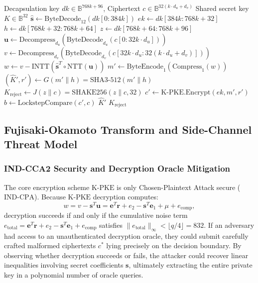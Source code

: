 \begin{algorithm}[t]
\caption{\mbox{ML-KEM.Decaps}$(dk, c)$ \cite{fips203}}
\label{alg:decaps}
\begin{algorithmic}[1]
\Require Decapsulation key $dk \in \mathbb{B}^{768k + 96}$, Ciphertext $c \in \mathbb{B}^{32(k\cdot d_u + d_v)}$
\Ensure Shared secret key $K \in \mathbb{B}^{32}$
\State $\hat{\mathbf{s}} \leftarrow \text{ByteDecode}_{12}(dk[0 : 384k])$ 
\State $ek \leftarrow dk[384k : 768k + 32]$
\State $h \leftarrow dk[768k + 32 : 768k + 64]$
\State $z \leftarrow dk[768k + 64 : 768k + 96]$
\State $\mathbf{u} \leftarrow \text{Decompress}_{d_u}(\text{ByteDecode}_{d_u}(c[0 : 32k\cdot d_u]))$
\State $v \leftarrow \text{Decompress}_{d_v}(\text{ByteDecode}_{d_v}(c[32k\cdot d_u : 32(k\cdot d_u + d_v)]))$
\State $w \leftarrow v - \text{INTT}(\hat{\mathbf{s}}^T \circ \text{NTT}(\mathbf{u}))$ 
\State $m' \leftarrow \text{ByteEncode}_1(\text{Compress}_1(w))$
\State $(\hat{K}', r') \leftarrow G(m' \parallel h) = \text{SHA3-512}(m' \parallel h)$
\State $K_{\text{reject}} \leftarrow J(z \parallel c) = \text{SHAKE256}(z \parallel c, 32)$ 
\State $c' \leftarrow \text{K-PKE.Encrypt}(ek, m', r')$ 
\State $b \leftarrow \text{LockstepCompare}(c', c)$ 
 
    \State \Return $\hat{K}'$
\Else
    \State \Return $K_{\text{reject}}$
\EndIf
\end{algorithmic}
\end{algorithm}

\subsection{Fujisaki-Okamoto Transform and Side-Channel Threat Model}
\label{sec:prelim_fo_security}

\subsubsection{IND-CCA2 Security and Decryption Oracle Mitigation}
The core encryption scheme $\text{K-PKE}$ is only Chosen-Plaintext Attack secure ($\text{IND-CPA}$). Because $\text{K-PKE}$ decryption computes:
\begin{equation}
\label{eq:pke_noise_term}
w = v - \mathbf{s}^T \mathbf{u} = \mathbf{e}^T \mathbf{r} + e_2 - \mathbf{s}^T \mathbf{e}_1 + \mu + e_{\text{comp}},
\end{equation}
decryption succeeds if and only if the cumulative noise term $e_{\text{total}} = \mathbf{e}^T \mathbf{r} + e_2 - \mathbf{s}^T \mathbf{e}_1 + e_{\text{comp}}$ satisfies $\|e_{\text{total}}\|_\infty < \lfloor q/4 \rfloor = 832$. If an adversary had access to an unauthenticated decryption oracle, they could submit carefully crafted malformed ciphertexts $c^*$ lying precisely on the decision boundary. By observing whether decryption succeeds or fails, the attacker could recover linear inequalities involving secret coefficients $\mathbf{s}$, ultimately extracting the entire private key in a polynomial number of oracle queries.

